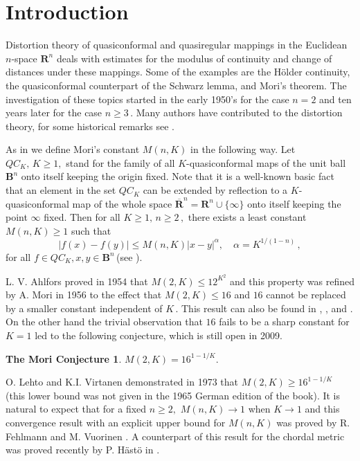 \documentclass[12pt,a4paper,leqno]{amsart}
\theoremstyle{plain}
\newtheorem{mconj}[equation]{The Mori Conjecture}
\numberwithin{equation}{section}          %
\begin{document}
\bigskip


\section{\sc Introduction}

Distortion theory of quasiconformal and quasiregular mappings in the
Euclidean $n$-space $\mathbf{R}^n$ deals
with estimates for the modulus of continuity and change of distances
under these mappings. Some of the examples are
the H\"older continuity, the quasiconformal counterpart of the Schwarz lemma, and
Mori's theorem. The investigation of these topics started in
the early 1950's for the case $n=2$ and ten years later for the case $n \ge 3 \,.$
Many authors have contributed to the distortion theory, for some historical
remarks see \cite[11.50]{vuobook}.

 As in \cite{fv} we define Mori's constant
$M(n,K)$ in the following way. Let $QC_K,\, K\ge 1,$ stand for the
family of all $K$-quasiconformal maps of the unit ball $
\mathbf{B}^n$ onto itself keeping the origin fixed. Note
that it is a well-known basic fact that an element in the set $QC_K$
can be extended by reflection to a $K$-quasiconformal map of the
whole space $\overline{\mathbf{R}}^n = {\mathbf{R}}^n \cup \{ \infty
\}$ onto itself keeping the point $\infty$ fixed. Then for all $K\ge
1,\, n\ge 2\,,$ there exists a least constant $M(n,K)\ge 1$ such
that
\begin{equation}
 |f(x)-f(y)| \le M(n,K)|x-y|^{\alpha}, \quad \alpha= K^{1/(1-n)}\,,
\end{equation}
for all $ f \in QC_K, x,y\in \mathbf{B}^n$\,(see \cite{fv}).



L. V. Ahlfors \cite{a} proved in 1954 that $M(2,K)\le 12^{K^2}$ and this property was refined by A. Mori
\cite{m} in 1956 to the effect that
 $M(2,K)\leq 16$  and $16$ cannot be replaced by a smaller constant
 independent of $K\,.$ This result can also be found in \cite{a2},
 \cite{fm}, and \cite{lv}.
 On the other hand the trivial observation that $16$
fails to be a sharp constant for $K =1$ led to the following
conjecture, which is still open in 2009.



\begin{mconj} \label{moriconj}   $M(2,K) = 16^{1-1/K}.$
\end{mconj}


 O. Lehto and K.I. Virtanen demonstrated in 1973 \cite[pp. 68]{lv} that
$M(2,K)\geq 16^{1-1/K}$ (this lower bound was not given in the 1965 German
edition of the book). It is natural to expect that for a fixed $n
\ge 2,$ $M(n,K) \to 1$ when $K \to 1$ and this convergence result with an explicit upper bound for $M(n,K)$ was proved by R.
Fehlmann and M. Vuorinen \cite{fv}. A counterpart of this result for the
chordal metric was proved recently by P. H\"ast\"o in \cite{h}.
\end{document}
